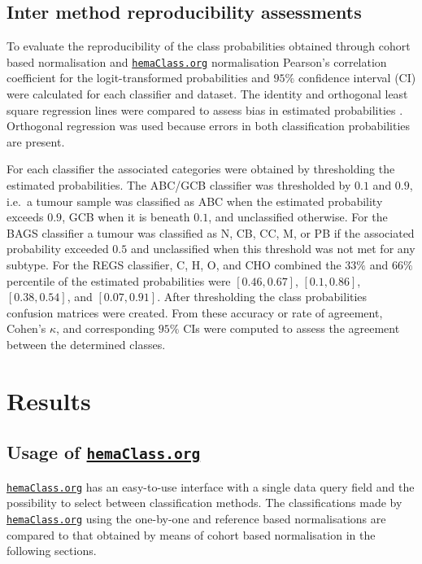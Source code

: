 \documentclass{article}
\newcommand{\hemaClass}{\href{http://hemaClass.org}{\texttt{hemaClass.org}}}
\begin{document}
\subsection{Inter method reproducibility assessments}
To evaluate the reproducibility of the class probabilities obtained through cohort based normalisation and \hemaClass{} normalisation Pearson's correlation coefficient for the logit-transformed probabilities and $95\%$ confidence interval (CI) were calculated for each classifier and dataset.
The identity and orthogonal least square regression lines were compared to assess bias in estimated probabilities \citep{CHEN1989}.
Orthogonal regression was used because errors in both classification probabilities are present.

For each classifier the associated categories were obtained by thresholding the estimated probabilities.
The ABC/GCB classifier was thresholded by $0.1$ and $0.9$, i.e.\ a tumour sample was classified as ABC when the estimated probability exceeds $0.9$, GCB when it is beneath $0.1$, and unclassified otherwise.
For the BAGS classifier a tumour was classified as N, CB, CC, M, or PB if the associated probability exceeded $0.5$ and unclassified when this threshold was not met for any subtype.
For the REGS classifier, C, H, O, and CHO combined the $33\%$ and $66\%$ percentile of the estimated probabilities were $[0.46, 0.67]$, $[0.1, 0.86]$, $[0.38, 0.54]$, and $[0.07, 0.91]$.
After thresholding the class probabilities confusion matrices were created.
From these accuracy or rate of agreement, Cohen's $\kappa$, and corresponding $95\%$ CIs were computed to assess the agreement between the determined classes.


\section{Results}
\subsection{Usage of \hemaClass{}}
\hemaClass{} has an easy-to-use interface with a single data query field and the possibility to select between classification methods.
The classifications made by \hemaClass{} using the one-by-one and reference based normalisations are compared to that obtained by means of cohort based normalisation in the following sections.
\end{document}
